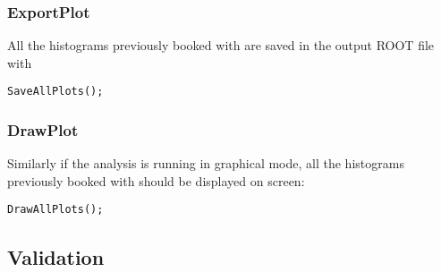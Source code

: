 \subsubsection{ExportPlot}
All the histograms previously booked with  are saved in the output ROOT file with

\begin{lstlisting}
SaveAllPlots();
\end{lstlisting} 

\subsubsection{DrawPlot}
Similarly if the analysis is running in graphical mode, all the histograms previously booked with
 should be displayed on screen:

\begin{lstlisting}
DrawAllPlots();
\end{lstlisting} 

\subsection{Validation}
